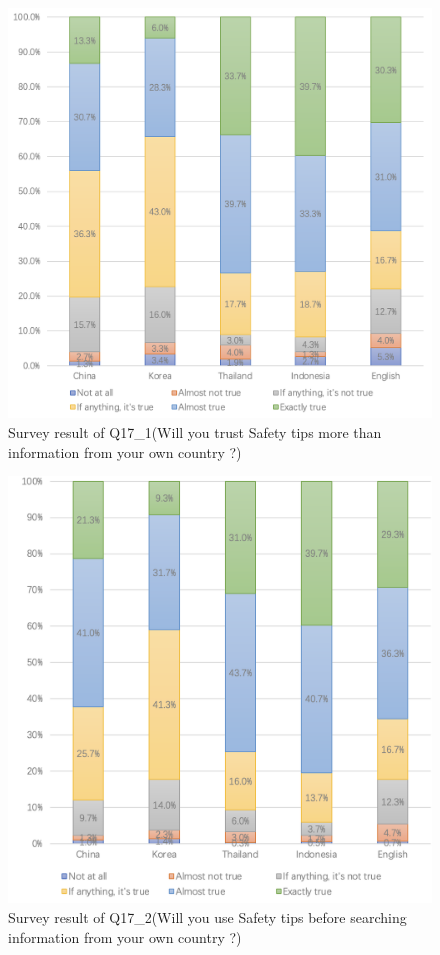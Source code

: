 \begin{figure}[h]
  \includegraphics[width=0.8\linewidth]{Figure/Figure15.jpg}
  \centering
  \caption[Survey result of Q17\_1]{Survey result of Q17\_1(Will you trust Safety tips more than information from your own country ?)}
  \label{fig15}
\end{figure}

\begin{figure}[h]
  \includegraphics[width=0.8\linewidth]{Figure/Figure16.jpg}
  \centering
  \caption[Survey result of Q17\_2]{Survey result of Q17\_2(Will you use Safety tips before searching information from your own country ?)}
  \label{fig16}
\end{figure}

